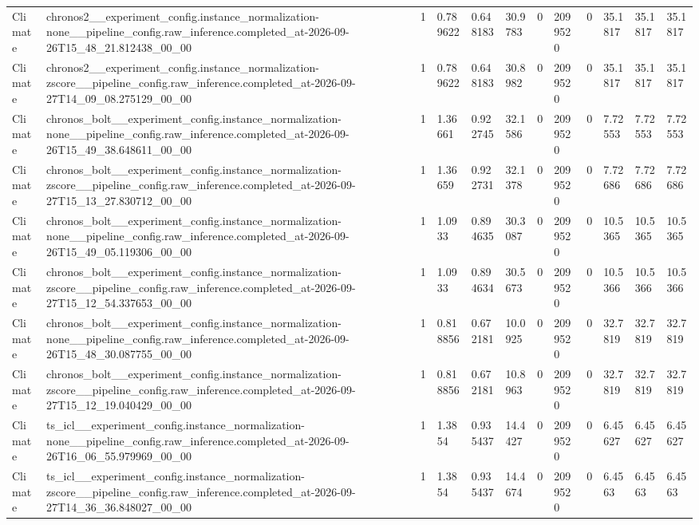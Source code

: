 \begin{tabular}{llllllllllll}
Climate & chronos2\_\_experiment\_config.instance\_normalization-none\_\_pipeline\_config.raw\_inference.completed\_at-2026-09-26T15\_48\_21.812438\_00\_00 & 1 & 0.789622 & 0.648183 & 30.9783 & 0 & 2099520 & 0 & 35.1817 & 35.1817 & 35.1817 \\
Climate & chronos2\_\_experiment\_config.instance\_normalization-zscore\_\_pipeline\_config.raw\_inference.completed\_at-2026-09-27T14\_09\_08.275129\_00\_00 & 1 & 0.789622 & 0.648183 & 30.8982 & 0 & 2099520 & 0 & 35.1817 & 35.1817 & 35.1817 \\
Climate & chronos\_bolt\_\_experiment\_config.instance\_normalization-none\_\_pipeline\_config.raw\_inference.completed\_at-2026-09-26T15\_49\_38.648611\_00\_00 & 1 & 1.36661 & 0.922745 & 32.1586 & 0 & 2099520 & 0 & 7.72553 & 7.72553 & 7.72553 \\
Climate & chronos\_bolt\_\_experiment\_config.instance\_normalization-zscore\_\_pipeline\_config.raw\_inference.completed\_at-2026-09-27T15\_13\_27.830712\_00\_00 & 1 & 1.36659 & 0.922731 & 32.1378 & 0 & 2099520 & 0 & 7.72686 & 7.72686 & 7.72686 \\
Climate & chronos\_bolt\_\_experiment\_config.instance\_normalization-none\_\_pipeline\_config.raw\_inference.completed\_at-2026-09-26T15\_49\_05.119306\_00\_00 & 1 & 1.0933 & 0.894635 & 30.3087 & 0 & 2099520 & 0 & 10.5365 & 10.5365 & 10.5365 \\
Climate & chronos\_bolt\_\_experiment\_config.instance\_normalization-zscore\_\_pipeline\_config.raw\_inference.completed\_at-2026-09-27T15\_12\_54.337653\_00\_00 & 1 & 1.0933 & 0.894634 & 30.5673 & 0 & 2099520 & 0 & 10.5366 & 10.5366 & 10.5366 \\
Climate & chronos\_bolt\_\_experiment\_config.instance\_normalization-none\_\_pipeline\_config.raw\_inference.completed\_at-2026-09-26T15\_48\_30.087755\_00\_00 & 1 & 0.818856 & 0.672181 & 10.0925 & 0 & 2099520 & 0 & 32.7819 & 32.7819 & 32.7819 \\
Climate & chronos\_bolt\_\_experiment\_config.instance\_normalization-zscore\_\_pipeline\_config.raw\_inference.completed\_at-2026-09-27T15\_12\_19.040429\_00\_00 & 1 & 0.818856 & 0.672181 & 10.8963 & 0 & 2099520 & 0 & 32.7819 & 32.7819 & 32.7819 \\
Climate & ts\_icl\_\_experiment\_config.instance\_normalization-none\_\_pipeline\_config.raw\_inference.completed\_at-2026-09-26T16\_06\_55.979969\_00\_00 & 1 & 1.3854 & 0.935437 & 14.4427 & 0 & 2099520 & 0 & 6.45627 & 6.45627 & 6.45627 \\
Climate & ts\_icl\_\_experiment\_config.instance\_normalization-zscore\_\_pipeline\_config.raw\_inference.completed\_at-2026-09-27T14\_36\_36.848027\_00\_00 & 1 & 1.3854 & 0.935437 & 14.4674 & 0 & 2099520 & 0 & 6.4563 & 6.4563 & 6.4563 \\

\end{tabular}
